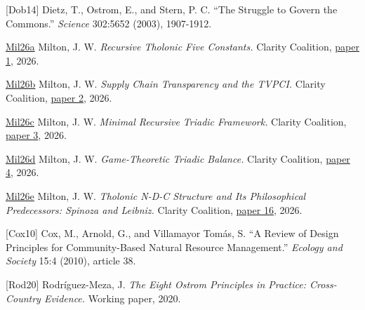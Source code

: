 \documentclass[12pt]{article}
\begin{document}
{[}Dob14{]} Dietz, T., Ostrom, E., and Stern, P. C. ``The Struggle to
Govern the Commons.'' \emph{Science} 302:5652 (2003), 1907-1912.

\href{https://github.com/baardev/truevalue/blob/main/docnav/Research/papers/1_recursive-tholonic-five-constants/1_recursive-tholonic-five-constants.pdf}{Mil26a}
Milton, J. W. \emph{Recursive Tholonic Five Constants.} Clarity
Coalition,
\href{https://github.com/baardev/truevalue/blob/main/docnav/Research/papers/1_recursive-tholonic-five-constants/1_recursive-tholonic-five-constants.pdf}{paper
1}, 2026.

\href{https://github.com/baardev/truevalue/blob/main/docnav/Research/papers/2_supply-chain-transparency-tvpci/2_supply-chain-transparency-tvpci.pdf}{Mil26b}
Milton, J. W. \emph{Supply Chain Transparency and the TVPCI.} Clarity
Coalition,
\href{https://github.com/baardev/truevalue/blob/main/docnav/Research/papers/2_supply-chain-transparency-tvpci/2_supply-chain-transparency-tvpci.pdf}{paper
2}, 2026.

\href{https://github.com/baardev/truevalue/blob/main/docnav/Research/papers/3_minimal-recursive-triadic-framework/3_minimal-recursive-triadic-framework.pdf}{Mil26c}
Milton, J. W. \emph{Minimal Recursive Triadic Framework.} Clarity
Coalition,
\href{https://github.com/baardev/truevalue/blob/main/docnav/Research/papers/3_minimal-recursive-triadic-framework/3_minimal-recursive-triadic-framework.pdf}{paper
3}, 2026.

\href{https://github.com/baardev/truevalue/blob/main/docnav/Research/papers/4_game-theoretic-triadic-balance/4_game-theoretic-triadic-balance.pdf}{Mil26d}
Milton, J. W. \emph{Game-Theoretic Triadic Balance.} Clarity Coalition,
\href{https://github.com/baardev/truevalue/blob/main/docnav/Research/papers/4_game-theoretic-triadic-balance/4_game-theoretic-triadic-balance.pdf}{paper
4}, 2026.

\href{https://github.com/baardev/truevalue/blob/main/docnav/Research/papers/16_tholonic-spinoza-leibniz/16_tholonic-spinoza-leibniz.pdf}{Mil26e}
Milton, J. W. \emph{Tholonic N-D-C Structure and Its Philosophical
Predecessors: Spinoza and Leibniz.} Clarity Coalition,
\href{https://github.com/baardev/truevalue/blob/main/docnav/Research/papers/16_tholonic-spinoza-leibniz/16_tholonic-spinoza-leibniz.pdf}{paper
16}, 2026.

{[}Cox10{]} Cox, M., Arnold, G., and Villamayor Tomás, S. ``A Review of
Design Principles for Community-Based Natural Resource Management.''
\emph{Ecology and Society} 15:4 (2010), article 38.

{[}Rod20{]} Rodríguez-Meza, J. \emph{The Eight Ostrom Principles in
Practice: Cross-Country Evidence.} Working paper, 2020.
\end{document}

